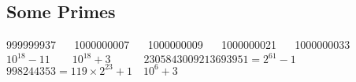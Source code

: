 \subsection{Some Primes}

999999937 $\quad$ 1000000007 $\quad$ 1000000009 $\quad$ 1000000021 $\quad$ 1000000033
$10^{18} - 11 \quad\quad 10^{18} + 3 \quad\quad\quad 2305843009213693951 = 2^{61} - 1$
$998244353 = 119 \times 2^{23} + 1 \quad 10^6+3$
